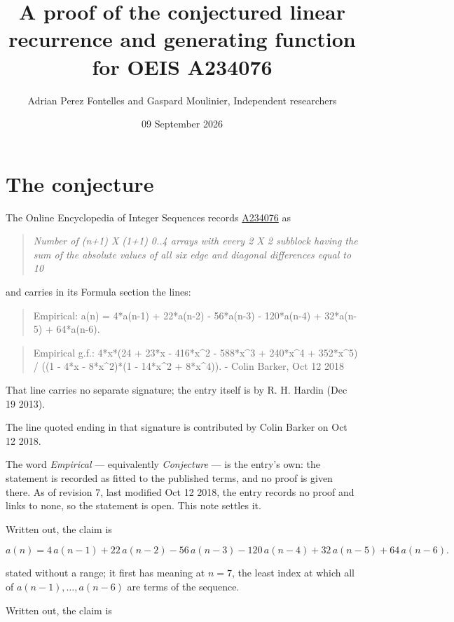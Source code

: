 \documentclass[11pt]{article}
\title{A proof of the conjectured linear recurrence and generating function for OEIS A234076}
\author{Adrian Perez Fontelles and Gaspard Moulinier, Independent researchers}
\date{09 September 2026}
\theoremstyle{definition}
\begin{document}
\maketitle
\section{The conjecture}

The Online Encyclopedia of Integer Sequences records \href{https://oeis.org/A234076}{A234076} as

\begin{quote}\itshape Number of (n+1) X (1+1) 0..4 arrays with every 2 X 2 subblock having the sum of the absolute values of all six edge and diagonal differences equal to 10\end{quote}

and carries in its Formula section the lines:

\begin{quote}\ttfamily Empirical: a(n) = 4*a(n-1) + 22*a(n-2) - 56*a(n-3) - 120*a(n-4) + 32*a(n-5) + 64*a(n-6).\end{quote}

\begin{quote}\ttfamily Empirical g.f.: 4*x*(24 + 23*x - 416*x\textasciicircum{}2 - 588*x\textasciicircum{}3 + 240*x\textasciicircum{}4 + 352*x\textasciicircum{}5) / ((1 - 4*x - 8*x\textasciicircum{}2)*(1 - 14*x\textasciicircum{}2 + 8*x\textasciicircum{}4)). - Colin Barker, Oct 12 2018\end{quote}

That line carries no separate signature; the entry itself is by R. H. Hardin (Dec 19 2013).

The line quoted ending in that signature is contributed by Colin Barker on Oct 12 2018.

The word {\itshape Empirical} --- equivalently {\itshape Conjecture} --- is the entry's own: the statement is recorded as fitted to the published terms, and no proof is given there. As of revision 7, last modified Oct 12 2018, the entry records no proof and links to none, so the statement is open. This note settles it.

Written out, the claim is

\[a(n) = 4\,a(n-1) + 22\,a(n-2) - 56\,a(n-3) - 120\,a(n-4) + 32\,a(n-5) + 64\,a(n-6).\]

stated without a range; it first has meaning at $n = 7$, the least index at which all of $a(n-1),\dots,a(n-6)$ are terms of the sequence.

Written out, the claim is
\end{document}
